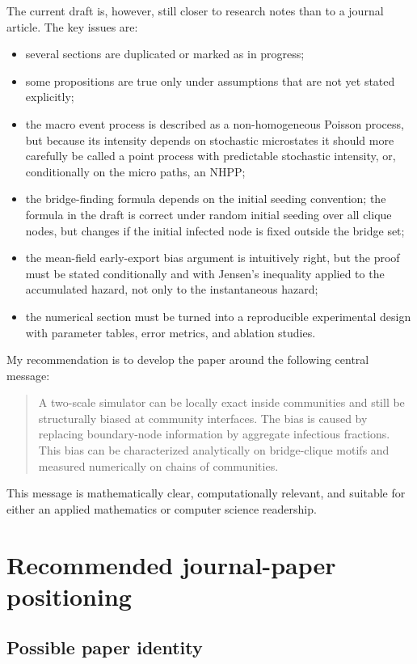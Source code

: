 \documentclass[12pt,a4paper]{article}
\theoremstyle{definition}
\newcommand{\1}{\mathbf{1}}
\begin{document}
The current draft is, however, still closer to research notes than to a journal article.  The key issues are:
\begin{itemize}
    \item several sections are duplicated or marked as in progress;
    \item some propositions are true only under assumptions that are not yet stated explicitly;
    \item the macro event process is described as a non-homogeneous Poisson process, but because its intensity depends on stochastic microstates it should more carefully be called a point process with predictable stochastic intensity, or, conditionally on the micro paths, an NHPP;
    \item the bridge-finding formula depends on the initial seeding convention; the formula in the draft is correct under random initial seeding over all clique nodes, but changes if the initial infected node is fixed outside the bridge set;
    \item the mean-field early-export bias argument is intuitively right, but the proof must be stated conditionally and with Jensen's inequality applied to the accumulated hazard, not only to the instantaneous hazard;
    \item the numerical section must be turned into a reproducible experimental design with parameter tables, error metrics, and ablation studies.
\end{itemize}

My recommendation is to develop the paper around the following central message:

\begin{quote}
    A two-scale simulator can be locally exact inside communities and still be structurally biased at community interfaces.  The bias is caused by replacing boundary-node information by aggregate infectious fractions.  This bias can be characterized analytically on bridge-clique motifs and measured numerically on chains of communities.
\end{quote}

This message is mathematically clear, computationally relevant, and suitable for either an applied mathematics or computer science readership.

\section{Recommended journal-paper positioning}

\subsection{Possible paper identity}
\end{document}
